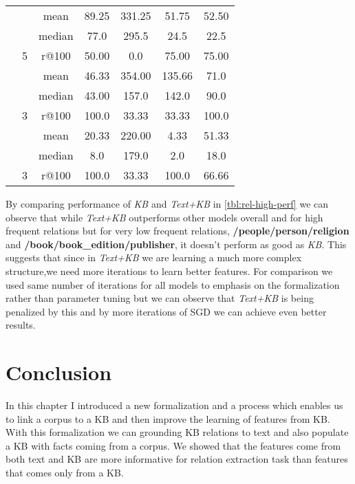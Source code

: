 \begin{table}[ht]
\begin{tabular}{l  c c c c  c c}
    &   & mean & 89.25 & 331.25  & 51.75 & 52.50  \\[-1ex]
   &  & median & 77.0 & 295.5 & 24.5 & 22.5 \\[-1ex]
\raisebox{0.0ex}{ /music/composer/compositions} &  5
 &r@100& 50.00 & 0.0 & 75.00 & 75.00 \\[1ex]
 
    &   & mean & 46.33 & 354.00 & 135.66 &71.0  \\[-1ex]
   &  & median & 43.00 &  157.0 & 142.0 & 90.0 \\[-1ex]
\raisebox{0.0ex}{  /book/book\_edition/publisher} &  3
 &r@100& 100.0 & 33.33  & 33.33 & 100.0 \\[1ex]
 
      &   & mean & 20.33 & 220.00 & 4.33 & 51.33 \\[-1ex]
   &  & median & 8.0 & 179.0 & 2.0 & 18.0 \\[-1ex]
\raisebox{0.0ex}{ /people/person/religion} &  3
 &r@100& 100.0 &33.33  & 100.0 & 66.66 \\[1ex]
 

\hline %
\end{tabular}

\end{table}

By comparing performance of \textit{KB} and \textit{Text+KB} in
\autoref{tbl:rel-high-perf} we can observe that while \textit{Text+KB}
outperforms other models overall and for high frequent relations but for very
low frequent relations, \textbf{/people/person/religion} and
\textbf{/book/book\_edition/publisher}, it doesn't perform as good
as \textit{KB}.
This suggests that since in \textit{Text+KB} we are learning a much more complex
structure,we need more iterations to learn better features. For comparison we
used same number of iterations for all models to emphasis on the formalization
rather than parameter tuning but we can observe that \textit{Text+KB} is being
penalized by this and by more iterations of SGD we can achieve even better
results.

\section{Conclusion}
\label{sec:textkb-conc}

In this chapter I introduced a new formalization and a process which
enables us to link a corpus to a KB and then improve the learning of features
from KB. With this formalization we can grounding KB relations to
 text and also populate a KB with facts coming from a corpus. We showed that the features come
from both text and KB are more informative for relation extraction task than
features that comes only from a KB. 
